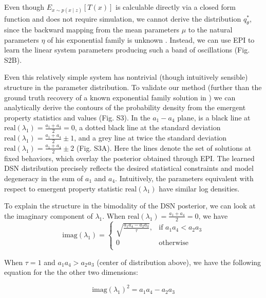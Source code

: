 \documentclass[11pt]{article}
\begin{document}
Even though $E_{x\sim p(x \mid z)}\left[T(x)\right]$ is calculable directly via a closed form function and does not require simulation, we cannot derive the distribution $q^*_\theta$, since the backward mapping from the mean parameters $\mu$ to the natural parameters $\eta$ of his exponential family is unknown \cite{wainwright2008graphical}.  Instead, we can use EPI to learn the linear system parameters producing such a band of oscillations (Fig. S2B). 

Even this relatively simple system has nontrivial (though intuitively sensible) structure in the parameter distribution.  To validate our method (further than the ground truth recovery of a known exponential family solution in \cite{loaiza2017maximum}) we can analytically derive the contours of the probability density from the emergent property statistics and values (Fig. S3).  In the $a_1-a_4$ plane, is a black line at $\text{real}(\lambda_1) = \frac{a_1 + a_4}{2} = 0$, a dotted black line at
the standard deviation $\text{real}(\lambda_1) = \frac{a_1 + a_4}{2} \pm 1$, and a grey line at twice the standard deviation
$\text{real}(\lambda_1) = \frac{a_1 + a_4}{2} \pm 2$ (Fig. S3A). Here the lines denote the set of solutions at fixed behaviors, which overlay the posterior obtained through EPI.  The learned DSN distribution precisely reflects the desired statistical constraints and model degeneracy in the sum of
$a_1$ and $a_4$. Intuitively, the parameters equivalent with respect to emergent property statistic $\text{real}(\lambda_1)$ have similar log densities.

To explain the structure in the bimodality of the DSN posterior, we can look at the imaginary component of $\lambda_1$.  When $\text{real}(\lambda_1) = \frac{a_1 + a_4}{2} = 0$, we have
\begin{equation}
\text{imag}(\lambda_1) = \begin{cases}
                             \sqrt{\frac{a_1 a_4 - a_2 a_3}{\tau}},  & \text{if } a_1 a_4 < a_2 a_3 \\
                             0 & \text{otherwise } \\
                         \end{cases} 
\end{equation}

When $\tau=1$ and $a_1 a_4 > a_2 a_3$ (center of distribution above), we have the following equation for the the other two dimensions:

\begin{equation}
\text{imag}(\lambda_1)^2 = a_1 a_4 - a_2 a_3
\end{equation}
\end{document}
